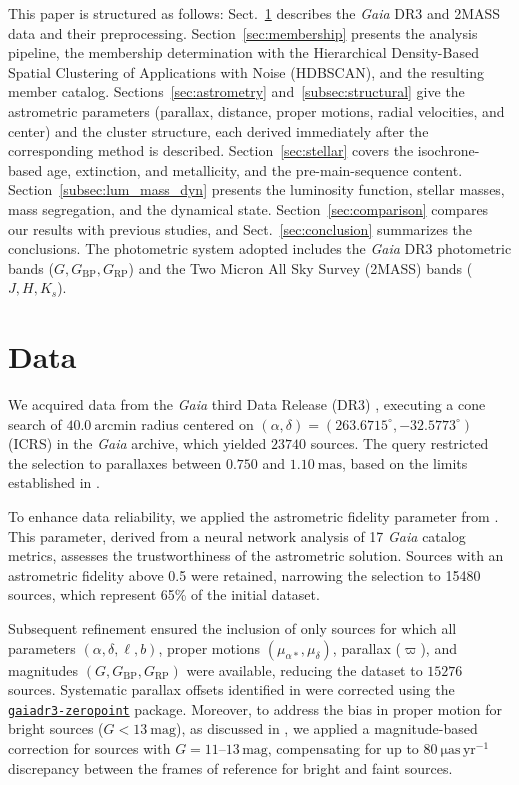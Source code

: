 \documentclass{aa}
\begin{document}
This paper is structured as follows: Sect.~\ref{sec:data} describes the \textit{Gaia} DR3 and 2MASS data and their preprocessing. Section~\ref{sec:membership} presents the analysis pipeline, the membership determination with the Hierarchical Density-Based Spatial Clustering of Applications with Noise (HDBSCAN), and the resulting member catalog. Sections~\ref{sec:astrometry} and~\ref{subsec:structural} give the astrometric parameters (parallax, distance, proper motions, radial velocities, and center) and the cluster structure, each derived immediately after the corresponding method is described. Section~\ref{sec:stellar} covers the isochrone-based age, extinction, and metallicity, and the pre-main-sequence content. Section~\ref{subsec:lum_mass_dyn} presents the luminosity function, stellar masses, mass segregation, and the dynamical state. Section~\ref{sec:comparison} compares our results with previous studies, and Sect.~\ref{sec:conclusion} summarizes the conclusions. The photometric system adopted includes the \textit{Gaia} DR3 photometric bands ($G, G_{\text{BP}}, G_{\text{RP}}$) and the Two Micron All Sky Survey (2MASS) bands ($J, H, K_s$).

\section{Data}\label{sec:data}
We acquired data from the \textit{Gaia} third Data Release (DR3) \citep{2016A&A...595A...1G,2023A&A...674A...1G}, executing a cone search of $40.0~\mathrm{arcmin}$ radius centered on $(\alpha,\delta)=(263.6715^{\circ},-32.5773^{\circ})$ (ICRS) in the \textit{Gaia} archive, which yielded $23740$ sources. The query restricted the selection to parallaxes between $0.750$ and $1.10~\mathrm{mas}$, based on the limits established in \citet{2024arXiv240301030P}.

To enhance data reliability, we applied the astrometric fidelity parameter from \citet{2022MNRAS.510.2597R}. This parameter, derived from a neural network analysis of 17 \textit{Gaia} catalog metrics, assesses the trustworthiness of the astrometric solution. Sources with an astrometric fidelity above 0.5 were retained, narrowing the selection to 15480 sources, which represent 65\% of the initial dataset.

Subsequent refinement ensured the inclusion of only sources for which all parameters $(\alpha,\delta,\ell,b)$, proper motions $(\mu_{\alpha*},\mu_\delta)$, parallax ($\varpi$), and magnitudes $(G, G_\mathrm{BP}, G_\mathrm{RP})$ were available, reducing the dataset to $15276$ sources. Systematic parallax offsets identified in \citet{2021A&A...649A...4L} were corrected using the \href{https://pypi.org/project/gaiadr3-zeropoint/}{\texttt{gaiadr3-zeropoint}} package. Moreover, to address the bias in proper motion for bright sources ($G<13~\mathrm{mag}$), as discussed in \citet{2021A&A...649A.124C}, we applied a magnitude-based correction for sources with $G = 11$--$13\,\mathrm{mag}$, compensating for up to $80~\mathrm{\mu as\,yr^{-1}}$ discrepancy between the frames of reference for bright and faint sources.
\end{document}
